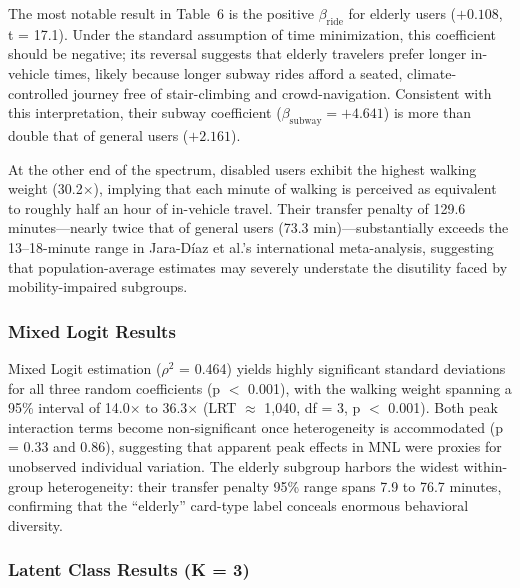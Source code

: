 The most notable result in Table~6 is the positive $\beta_{\mathrm{ride}}$
for elderly users ($+0.108$, t = 17.1). Under the standard assumption of time
minimization, this coefficient should be negative; its reversal suggests that
elderly travelers prefer longer in-vehicle times, likely because longer subway
rides afford a seated, climate-controlled journey free of stair-climbing and
crowd-navigation. Consistent with this interpretation, their subway
coefficient ($\beta_{\mathrm{subway}} = +4.641$) is more than double that of
general users ($+2.161$).

At the other end of the spectrum, disabled users exhibit the highest walking
weight (30.2$\times$), implying that each minute of walking is perceived as
equivalent to roughly half an hour of in-vehicle travel. Their transfer
penalty of 129.6 minutes---nearly twice that of general users (73.3
min)---substantially exceeds the 13--18-minute range in Jara-D\'iaz et
al.'s \cite{jaradiaz2022} international meta-analysis, suggesting that
population-average estimates may severely understate the disutility faced by
mobility-impaired subgroups.

\subsubsection{Mixed Logit Results}

Mixed Logit estimation ($\rho^2$ = 0.464) yields highly significant standard
deviations for all three random coefficients (p $<$ 0.001), with the walking
weight spanning a 95\% interval of 14.0$\times$ to 36.3$\times$ (LRT $\approx$
1,040, df = 3, p $<$ 0.001). Both peak interaction terms become
non-significant once heterogeneity is accommodated (p = 0.33 and 0.86),
suggesting that apparent peak effects in MNL were proxies for unobserved
individual variation. The elderly subgroup harbors the widest within-group
heterogeneity: their transfer penalty 95\% range spans 7.9 to 76.7 minutes,
confirming that the ``elderly'' card-type label conceals enormous behavioral
diversity.

\subsubsection{Latent Class Results (K = 3)}

